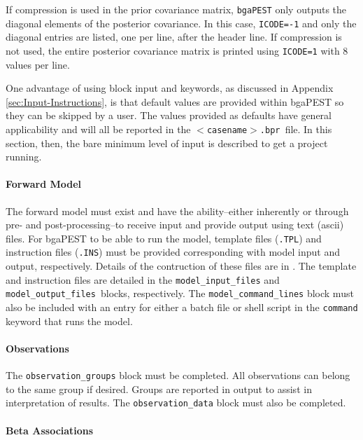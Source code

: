 \documentclass[11pt,oneside,onecolumn]{usgsreport}
\begin{document}
\begin{appendix}
If compression is used in the prior covariance matrix, \texttt{bgaPEST}
only outputs the diagonal elements of the posterior covariance. In
this case, \texttt{ICODE=-1} and only the diagonal entries are listed,
one per line, after the header line. If compression is not used, the
entire posterior covariance matrix is printed using \texttt{ICODE=1}
with 8 values per line.



One advantage of using block input and keywords, as discussed in Appendix
\ref{sec:Input-Instructions}, is that default values are provided
within bgaPEST so they can be skipped by a user. The values provided
as defaults have general applicability and will all be reported in
the \texttt{$<$casename$>$.bpr }file. In this section, then, the bare
minimum level of input is described to get a project running. 


\paragraph*{Forward Model}

The forward model must exist and have the ability--either inherently
or through pre- and post-processing--to receive input and provide
output using text (ascii) files. For bgaPEST to be able to run the
model, template files (\texttt{.TPL}) and instruction files (\texttt{.INS})
must be provided corresponding with model input and output, respectively.
Details of the contruction of these files are in \citep[chapter 3]{PEST}.
The template and instruction files are detailed in the \texttt{model\_input\_files}
and \texttt{model\_output\_files }blocks, respectively. The \texttt{model\_command\_lines}
block must also be included with an entry for either a batch file
or shell script in the \texttt{command} keyword that runs the model.


\paragraph*{Observations}

The \texttt{observation\_groups} block must be completed. All observations
can belong to the same group if desired. Groups are reported in output
to assist in interpretation of results. The \texttt{observation\_data}
block must also be completed.


\paragraph*{Beta Associations}


\end{appendix}
\end{document}
